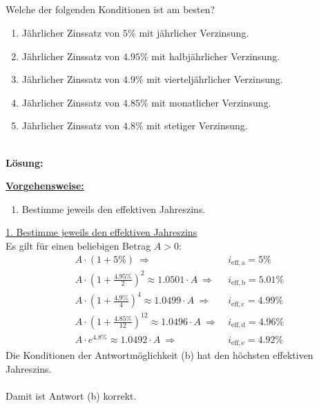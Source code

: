 \subsection*{}
Welche der folgenden Konditionen ist am besten?
\renewcommand{\labelenumi}{(\alph{enumi})}
\begin{enumerate}
	\item 
	Jährlicher Zinssatz von $5 \%$ mit jährlicher Verzinsung.
	\item
	Jährlicher Zinssatz von $4.95 \%$ mit halbjährlicher Verzinsung.
	\item
	Jährlicher Zinssatz von $4.9 \%$ mit vierteljährlicher Verzinsung.
	\item
	Jährlicher Zinssatz von $4.85 \%$ mit monatlicher Verzinsung.
	\item
	Jährlicher Zinssatz von $4.8 \%$ mit stetiger Verzinsung.	
\end{enumerate}
\ \\
\textbf{Lösung:}
\begin{mdframed}
\underline{\textbf{Vorgehensweise:}}
\renewcommand{\labelenumi}{\theenumi.}
\begin{enumerate}
\item Bestimme jeweils den effektiven Jahreszins.
\end{enumerate}
\end{mdframed}

\underline{1. Bestimme jeweils den effektiven Jahreszins}\\
Es gilt für einen beliebigen Betrag $A  > 0$:
\begin{align*}
	A \cdot 
	\left(
	1 + 5 \%
	\right)
	\ \Rightarrow \ &i_{\mathrm{eff,a}} = 5  \% \\
	A \cdot 
	\left(
	1 + \frac{4.95 \%}{2}
	\right)^2
	\approx 1.0501 \cdot A
	\ \Rightarrow \ &i_{\mathrm{eff,b}} = 5.01  \% \\
	A \cdot 
	\left(
	1 + \frac{4.9 \% }{4} 
	\right)^4
	\approx 1.0499 \cdot A
	\ \Rightarrow \ &i_{\mathrm{eff,c}} = 4.99  \% \\
	A \cdot 
	\left(
	1 + \frac{4.85 \%}{12} 
	\right)^{12}
	\approx 1.0496 \cdot A
	\ \Rightarrow \ &i_{\mathrm{eff,d}} = 4.96  \% \\
	A \cdot 
	e^{4.8 \% }
	\approx 1.0492 \cdot A
	\ \Rightarrow \ &i_{\mathrm{eff,e}} = 4.92  \% 
\end{align*}
Die Konditionen der Antwortmöglichkeit (b) hat den höchsten effektiven Jahreszins.\\
\\
Damit ist Antwort (b) korrekt.


